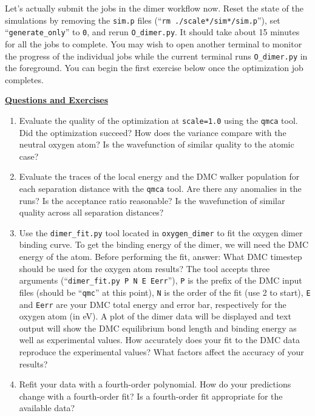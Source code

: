 Let's actually submit the jobs in the dimer workflow now.  Reset the state of the simulations by removing the \texttt{sim.p} files (``\texttt{rm ./scale*/sim*/sim.p}''), set ``\texttt{generate\_only}'' to \texttt{0}, and rerun \texttt{O\_dimer.py}.  It should take about 15 minutes for all the jobs to complete.  You may wish to open another terminal to monitor the progress of the individual jobs while the current terminal runs \texttt{O\_dimer.py} in the foreground.  You can begin the first exercise below once the optimization job completes.

\vspace{3cm}
\begin{flushleft}
\textbf{\underline{Questions and Exercises}}
\end{flushleft}
\begin{enumerate}
  \item{Evaluate the quality of the optimization at \texttt{scale=1.0} using the \texttt{qmca} tool.  Did the optimization succeed?  How does the variance compare with the neutral oxygen atom?  Is the wavefunction of similar quality to the atomic case?}

  \item{Evaluate the traces of the local energy and the DMC walker population for each separation distance with the \texttt{qmca} tool.  Are there any anomalies in the runs?  Is the acceptance ratio reasonable?  Is the wavefunction of similar quality across all separation distances?}

  \item{Use the \texttt{dimer\_fit.py} tool located in \texttt{oxygen\_dimer} to fit the oxygen dimer binding curve.   To get the binding energy of the dimer, we will need the DMC energy of the atom.  Before performing the fit, answer: What DMC timestep should be used for the oxygen atom results?  The tool accepts three arguments (``\texttt{dimer\_fit.py P N E Eerr}''}), \texttt{P} is the prefix of the DMC input files (should be ``\texttt{qmc}'' at this point), \texttt{N} is the order of the fit (use 2 to start), \texttt{E} and \texttt{Eerr} are your DMC total energy and error bar, respectively for the oxygen atom (in eV).  A plot of the dimer data will be displayed and text output will show the DMC equilibrium bond length and binding energy as well as experimental values.  How accurately does your fit to the DMC data reproduce the experimental values?  What factors affect the accuracy of your results? 

  \item{Refit your data with a fourth-order polynomial.  How do your predictions change with a fourth-order fit?  Is a fourth-order fit appropriate for the available data?}
 

\end{enumerate}
